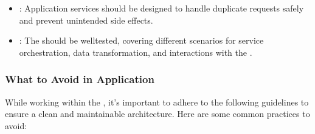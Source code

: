 \documentclass[letterpaper,10pt,english]{sphinxhowto}
\begin{document}
\begin{itemize}
\item {} 
\sphinxAtStartPar
{}:
Application services should be designed to handle duplicate requests safely and prevent unintended side effects.

\item {} 
\sphinxAtStartPar
{}:
The  should be well\sphinxhyphen{}tested, covering different scenarios for service orchestration, data transformation, and interactions with the .

\end{itemize}


\subsubsection{What to Avoid in Application}
\label{\detokenize{architecture/application/index:what-to-avoid-in-application}}
\sphinxAtStartPar
While working within the , it’s important to adhere to the following guidelines to ensure a clean and maintainable architecture. Here are some common practices to avoid:
\end{document}

